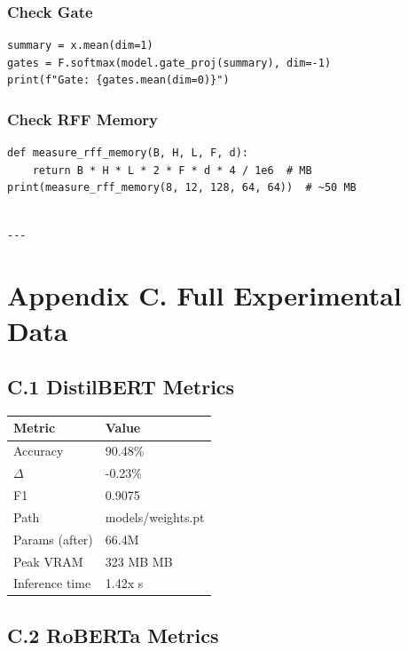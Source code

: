 \subsubsection{Check Gate}

\begin{lstlisting}
summary = x.mean(dim=1)
gates = F.softmax(model.gate_proj(summary), dim=-1)
print(f"Gate: {gates.mean(dim=0)}")
\end{lstlisting}

\subsubsection{Check RFF Memory}

\begin{lstlisting}
def measure_rff_memory(B, H, L, F, d):
    return B * H * L * 2 * F * d * 4 / 1e6  # MB
print(measure_rff_memory(8, 12, 128, 64, 64))  # ~50 MB
\end{lstlisting}
\begin{lstlisting}

---
\end{lstlisting}


\section{Appendix C. Full Experimental Data}

\subsection{C.1 DistilBERT Metrics}

\begin{table}[H]
\centering
\small
\begin{tabular}{ll}
\toprule
\textbf{Metric} & \textbf{Value} \\
\midrule
Accuracy & 90.48\% \\
$\Delta$ & -0.23\% \\
F1 & 0.9075 \\
Path & models/weights.pt \\
Params (after) & 66.4M \\
Peak VRAM & 323 MB MB \\
Inference time & 1.42x s \\
\bottomrule
\end{tabular}
\end{table}

\subsection{C.2 RoBERTa Metrics}

